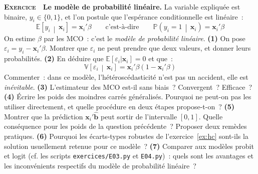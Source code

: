 \documentclass[10pt,a4paper,notitlepage]{article}
\newcounter{xnumber}
\newcommand{\exercice}{\refstepcounter{xnumber}\textsc{\textbf{Exercice}} \textbf{\thexnumber}\,\,}
\newcommand{\question}[1]{\textbf{(#1)}}
\begin{document}
\exercice\label{ex:mpl} \textbf{Le modèle de probabilité linéaire.} La variable
expliquée est binaire, $y_i\in\{0,1\}$, et l'on postule que l'espérance
conditionnelle est linéaire~:
\[
  \mathbb E\left[y_i\,\middle|\,\mathbf x_i\right] = \mathbf x_i'\beta
  \qquad\text{c'est-à-dire}\qquad
  \mathbb P\left(y_i=1\,\middle|\,\mathbf x_i\right) = \mathbf x_i'\beta
\]
On estime $\beta$ par les MCO~: c'est le \emph{modèle de probabilité linéaire}.
\question{1} On pose $\varepsilon_i = y_i-\mathbf x_i'\beta$. Montrer que
$\varepsilon_i$ ne peut prendre que deux valeurs, et donner leurs probabilités.
\question{2} En déduire que $\mathbb E[\varepsilon_i|\mathbf x_i]=0$ et que~:
\[
  \mathbb V\left[\varepsilon_i\,\middle|\,\mathbf x_i\right] = \mathbf x_i'\beta\left(1-\mathbf x_i'\beta\right)
\]
Commenter~: dans ce modèle, l'hétéroscédasticité n'est pas un accident, elle est
\emph{inévitable}. \question{3} L'estimateur des MCO est-il sans biais~?
Convergent~? Efficace~? \question{4} Écrire les poids des moindres carrés
généralisés. Pourquoi ne peut-on pas les utiliser directement, et quelle
procédure en deux étapes propose-t-on~? \question{5} Montrer que la prédiction
$\mathbf x_i'\hat{\mathbf b}$ peut sortir de l'intervalle $[0,1]$. Quelle
conséquence pour les poids de la question précédente~? Proposer deux remèdes
pratiques. \question{6} Pourquoi les écarts-types robustes de
l'exercice~\ref{ex:hc} sont-ils la solution usuellement retenue pour ce modèle~?
\question{7} Comparer aux modèles probit et logit (cf. les scripts
\texttt{exercices/E03.py} et \texttt{E04.py})~: quels sont les avantages et les
inconvénients respectifs du modèle de probabilité linéaire~?\newline

\bigskip
\end{document}
